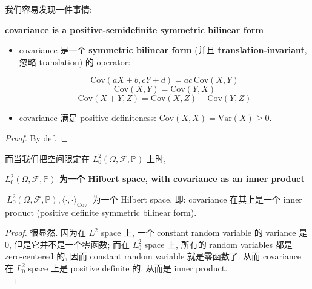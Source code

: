 \documentclass{qlnotes-export}
\begin{document}
我们容易发现一件事情:

\begin{theorem}{\protect{}\label{kn-covariance-positive-semidefinite-bilinear-form}{\textbf{covariance
is a positive-semidefinite symmetric bilinear form}}}

\begin{itemize}
\item
  covariance 是一个 \textbf{symmetric bilinear form} (并且 \textbf{translation-invariant}, 忽略 translation) 的 operator:

  \[\text{Cov}(aX + b,cY + d) = ac\,\text{Cov}(X,Y)\]\[\text{Cov}(X,Y) = \text{Cov}(Y,X)\]\[\text{Cov}(X + Y,Z) = \text{Cov}(X,Z) + \text{Cov}(Y,Z)\]
\item
  covariance 满足 positive definiteness: \(\text{Cov}(X,X) = \text{Var}(X) \geq 0\).
\end{itemize}

\end{theorem}

\begin{proof}

By def.

\end{proof}

而当我们把空间限定在 \(L_{0}^{2}(\Omega,\mathcal{F},{\mathbb{P}})\) 上时,

\begin{theorem}{\protect{}\label{kn-centered-l2-hilbert-space-under-covariance}{\textbf{\(L_{0}^{2}(\Omega,\mathcal{F},{\mathbb{P}})\)
为一个 Hilbert space, with covariance as an inner product}}}

\(\ L_{0}^{2}(\Omega,\mathcal{F},{\mathbb{P}}),\langle \cdot , \cdot \rangle_{\text{Cov}}\ \) 为一个 Hilbert space, 即: covariance 在其上是一个 inner product (positive definite symmetric bilinear form).

\end{theorem}

\begin{proof}

很显然. 因为在 \(L^{2}\) space 上, 一个 constant random variable 的 variance 是 0, 但是它并不是一个零函数; 而在 \(L_{0}^{2}\) space 上, 所有的 random variables 都是 zero-centered 的, 因而 constant random variable 就是零函数了. 从而 covariance 在 \(L_{0}^{2}\) space 上是 positive definite 的, 从而是 inner product.\\

\end{proof}
\end{document}
